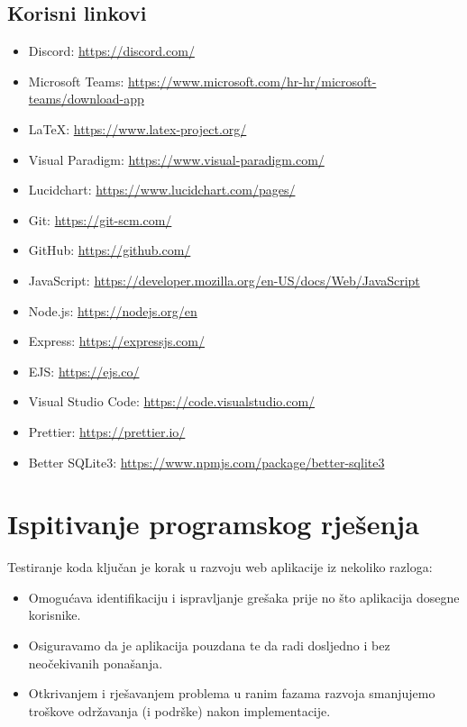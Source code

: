		\subsection*{Korisni linkovi}
			\begin{itemize}
				\item Discord: \url{https://discord.com/}
				\item Microsoft Teams: \url{https://www.microsoft.com/hr-hr/microsoft-teams/download-app}
				\item LaTeX: \url{https://www.latex-project.org/}
				\item Visual Paradigm: \url{https://www.visual-paradigm.com/}
				\item Lucidchart: \url{https://www.lucidchart.com/pages/}
				\item Git: \url{https://git-scm.com/}
				\item GitHub: \url{https://github.com/}
				\item JavaScript: \url{https://developer.mozilla.org/en-US/docs/Web/JavaScript}
				\item Node.js: \url{https://nodejs.org/en}
				\item Express: \url{https://expressjs.com/}
				\item EJS: \url{https://ejs.co/}
				\item Visual Studio Code: \url{https://code.visualstudio.com/}
				\item Prettier: \url{https://prettier.io/}
				\item Better SQLite3: \url{https://www.npmjs.com/package/better-sqlite3}
			\end{itemize}

				
			\eject 
		
	
		\section{Ispitivanje programskog rješenja}

			Testiranje koda ključan je korak u razvoju web aplikacije iz nekoliko razloga:
			\begin{itemize}
				\item Omogućava identifikaciju i ispravljanje grešaka prije no što aplikacija dosegne korisnike.
				\item Osiguravamo da je aplikacija pouzdana te da radi dosljedno i bez neočekivanih ponašanja.
				\item Otkrivanjem i rješavanjem problema u ranim fazama razvoja smanjujemo troškove održavanja (i podrške) nakon implementacije.
			\end{itemize}

